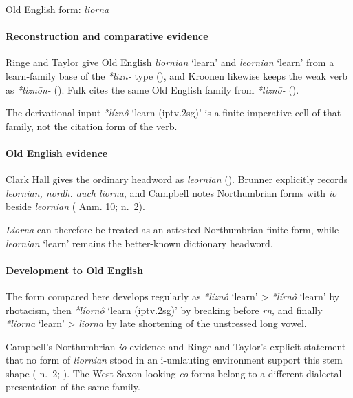 \documentclass[
  british,
  a4paper,
]{article}
\providecommand{\Recon}[1]{\emph{*#1}}
\begin{document}
Old English form: \emph{liorna}

\paragraph{Reconstruction and comparative
evidence}\label{reconstruction-and-comparative-evidence-138}

Ringe and Taylor give Old English {\emph{liornian}} `learn' and
{\emph{leornian}} `learn' from a learn-family base of the \emph{*lizn-}
type (), and
Kroonen likewise keeps the weak verb as \emph{*liznōn-}
(). Fulk cites the same Old
English family from \emph{*liznō-} ().

The derivational input \Recon{líznô} `learn (iptv.2sg)' is a finite
imperative cell of that family, not the citation form of the verb.

\paragraph{Old English evidence}\label{old-english-evidence-138}

Clark Hall gives the ordinary headword as \emph{leornian}
(). Brunner explicitly
records \emph{leornian, nordh. auch liorna}, and Campbell notes
Northumbrian forms with \emph{io} beside \emph{leornian}
( Anm. 10;
 n.~2).

{\emph{Liorna}} can therefore be treated as an attested Northumbrian
finite form, while {\emph{leornian}} `learn' remains the better-known
dictionary headword.

\paragraph{Development to Old
English}\label{development-to-old-english-138}

The form compared here develops regularly as \Recon{líznô} `learn'
\textgreater{} \Recon{lírnô} `learn' by rhotacism, then \Recon{líornô}
`learn (iptv.2sg)' by breaking before \emph{rn}, and finally
\Recon{líorna} `learn' \textgreater{} \emph{liorna} by late shortening
of the unstressed long vowel.

Campbell's Northumbrian \emph{io} evidence and Ringe and Taylor's
explicit statement that no form of \emph{liornian} stood in an
i-umlauting environment support this stem shape
( n.~2;
). The
West-Saxon-looking \emph{eo} forms belong to a different dialectal
presentation of the same family.
\end{document}
